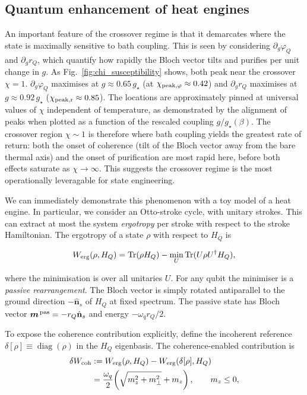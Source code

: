 \subsection{Quantum enhancement of heat engines}
An important feature of the crossover regime is that it demarcates where the
state is maximally sensitive to bath coupling. This is seen by considering
\(\partial_g\varphi_Q\) and \(\partial_g r_Q\), which quantify how rapidly the
Bloch vector tilts and purifies per unit change in \(g\). As
Fig.~\ref{fig:chi_susceptibility} shows, both peak near the
crossover $\chi =1$. $\partial_g\varphi_Q$ maximises at $g \approx 0.65\,g_\star$
(at $\chi_{\rm peak,\varphi}\approx 0.42$) and $\partial_g r_Q$ maximises at $g
\approx 0.92\,g_\star$ ($\chi_{\rm peak,r}\approx 0.85$).  The locations are
approximately pinned at universal values of $\chi$ independent of temperature, as demonstrated by the alignment of peaks when plotted as a function of the rescaled coupling $g/g_\star(\beta)$. The crossover region $\chi\sim 1$ is therefore where bath coupling yields the
greatest rate of return: both the onset of coherence (tilt of the Bloch vector
away from the bare thermal axis) and the onset of purification are most rapid
here, before both effects saturate as $\chi\to\infty$.  This suggests the
crossover regime is the most operationally leveragable for state engineering. 

We can immediately demonstrate this phenomenon with a toy model of a heat engine. In particular, we consider an Otto-stroke cycle, with unitary strokes. This can extract at most the system
\emph{ergotropy} per stroke with respect to the stroke Hamiltonian. The ergotropy of a state $\rho$ with respect to $H_Q$ is

\begin{equation}
  W_{\rm erg}(\rho,H_Q)
  = \Tr(\rho H_Q) - \min_{U}\Tr(U\rho U^\dagger H_Q),
  \label{eq:ergotropy_def}
\end{equation}

where the minimisation is over all unitaries \(U\). For any qubit the
minimiser is a \emph{passive rearrangement}. The Bloch vector is simply rotated
antiparallel to the ground direction $-\hat{\mathbf{n}}_s$ of $H_Q$ at
fixed spectrum. The passive state has Bloch vector
\(\vec{m}^{\,\rm pas}=-r_Q\hat{\mathbf n}_s\) and energy
\(-\omega_q r_Q/2\).

To expose the coherence contribution explicitly, define the incoherent
reference \(\delta[\rho]\equiv\operatorname{diag}(\rho)\) in the \(H_Q\)
eigenbasis. The coherence-enabled contribution is
\begin{equation}
\begin{split}
  \delta W_{\rm coh} &:= W_{\rm erg}(\rho,H_Q)-W_{\rm erg}(\delta[\rho],H_Q) \\
  &= \frac{\omega_q}{2}\!\left(\sqrt{m_z^2+m_\perp^2}+m_z\right), \qquad m_z\le 0,
\end{split}
\label{eq:delta_W_coh}
\end{equation}

